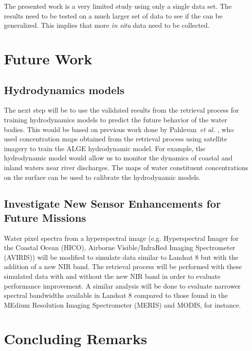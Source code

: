 The presented work is a very limited study using only a single data set. The results need to be tested on a much larger set of data to see if the can be generalized. This implies that more {\it in situ} data need to be collected.

\section{Future Work}
\subsection{Hydrodynamics models} 
The next step will be to use the validated results from the retrieval process for training hydrodynamics models to predict the future behavior of the water bodies. This would be based on previous work done by Pahlevan~{\it et al.} \cite{Pahlevan:2012b}, who used concentration maps obtained from the retrieval process using satellite imagery to train the ALGE hydrodynamic model. For example, the hydrodynamic model would allow us to monitor the dynamics of coastal and inland waters near river discharges. The maps of water constituent concentrations on the surface can be used to calibrate the hydrodynamic models.

\subsection{Investigate New Sensor Enhancements for Future Missions}
Water pixel spectra from a hyperspectral image (e.g. Hyperspectral Imager for the Coastal Ocean (HICO),  Airborne Visible/InfraRed Imaging Spectrometer (AVIRIS)) will be modified to simulate data similar to Landsat 8 but with the addition of a new NIR band. The retrieval process will be performed with these simulated data with and without the new NIR band in order to evaluate performance improvement. A similar analysis will be done to evaluate narrower spectral bandwidths available in Landsat 8 compared to those found in the MEdium Resolution Imaging Spectrometer (MERIS) and MODIS, for instance. 

\section{Concluding Remarks}
